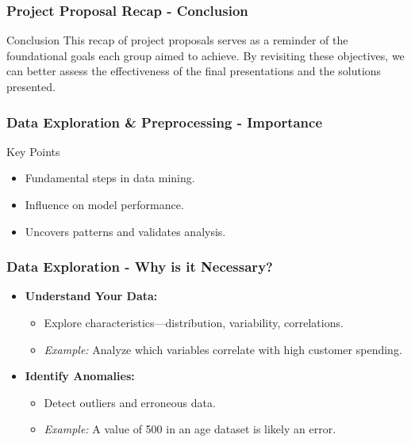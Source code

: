 \documentclass[aspectratio=169]{beamer}
\begin{document}
\begin{frame}[fragile]
    \frametitle{Project Proposal Recap - Conclusion}
    \begin{block}{Conclusion}
        This recap of project proposals serves as a reminder of the foundational goals each group aimed to achieve. 
        By revisiting these objectives, we can better assess the effectiveness of the final presentations and the solutions presented. 
    \end{block}
\end{frame}

\begin{frame}[fragile]
    \frametitle{Data Exploration \& Preprocessing - Importance}
    \begin{block}{Key Points}
        \begin{itemize}
            \item Fundamental steps in data mining.
            \item Influence on model performance.
            \item Uncovers patterns and validates analysis.
        \end{itemize}
    \end{block}
\end{frame}

\begin{frame}[fragile]
    \frametitle{Data Exploration - Why is it Necessary?}
    \begin{itemize}
        \item \textbf{Understand Your Data:}
        \begin{itemize}
            \item Explore characteristics—distribution, variability, correlations.
            \item \textit{Example:} Analyze which variables correlate with high customer spending.
        \end{itemize}
        
        \item \textbf{Identify Anomalies:}
        \begin{itemize}
            \item Detect outliers and erroneous data.
            \item \textit{Example:} A value of 500 in an age dataset is likely an error.
        \end{itemize}
    \end{itemize}
\end{frame}
\end{document}
